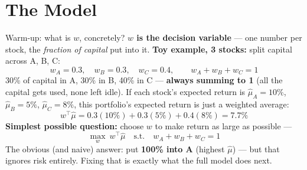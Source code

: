 \documentclass[aspectratio=169]{beamer}
\newcommand{\muhat}{\hat{\mu}}
\begin{document}
\section{The Model}

\begin{frame}{Warm-up: what is $w$, concretely?}
  \textbf{$w$ is the decision variable} --- one number per stock, the \emph{fraction of
  capital} put into it.
  \vspace{0.12cm}
  \textbf{Toy example, 3 stocks:} split capital across A, B, C:
  \[
    w_A = 0.3, \quad w_B = 0.3, \quad w_C = 0.4, \qquad w_A+w_B+w_C = 1
  \]
  30\% of capital in A, 30\% in B, 40\% in C --- \textbf{always summing to 1} (all the capital
  gets used, none left idle).
  \vspace{0.12cm}
  If each stock's expected return is $\muhat_A=10\%$, $\muhat_B=5\%$, $\muhat_C=8\%$, this
  portfolio's expected return is just a weighted average:
  \[
    w^\top\muhat = 0.3(10\%) + 0.3(5\%) + 0.4(8\%) = 7.7\%
  \]
  \vspace{0.12cm}
  \textbf{Simplest possible question:} choose $w$ to make return as large as possible ---
  \[
    \max_{w}\ w^\top\muhat \quad \text{s.t.}\quad w_A+w_B+w_C=1
  \]
  \small The obvious (and naive) answer: put \textbf{100\% into A} (highest $\muhat$) --- but
  that ignores risk entirely. Fixing that is exactly what the full model does next.
\end{frame}
\end{document}
